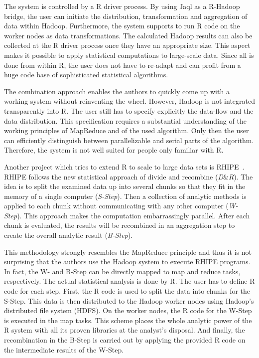 The system is controlled by a R driver process.
By using Jaql as a R-Hadoop bridge, the user can initiate the distribution, transformation and aggregation of data within Hadoop.
Furthermore, the system supports to run R code on the worker nodes as data transformations.
The calculated Hadoop results can also be collected at the R driver process once they have an appropriate size.
This aspect makes it possible to apply statistical computations to large-scale data.
Since all is done from within R, the user does not have to re-adapt and can profit from a huge code base of sophisticated statistical algorithms.

The combination approach enables the authors to quickly come up with a working system without reinventing the wheel.
However, Hadoop is not integrated transparently into R.
The user still has to specify explicitly the data-flow and the data distribution.
This specification requires a substantial understanding of the working principles of MapReduce and of the used algorithm.
Only then the user can efficiently distinguish between parallelizable and serial parts of the algorithm.
Therefore, the system is not well suited for people only familiar with R.

Another project which tries to extend R to scale to large data sets is RHIPE~\cite{guha:s2012a}.
RHIPE follows the new statistical approach of divide and recombine (\emph{D}\&\emph{R}).
The idea is to split the examined data up into several chunks so that they fit in the memory of a single computer (\emph{S-Step}).
Then a collection of analytic methods is applied to each chunk without communicating with any other computer (\emph{W-Step}).
This approach makes the computation embarrassingly parallel.
After each chunk is evaluated, the results will be recombined in an aggregation step to create the overall analytic result (\emph{B-Step}).

This methodology strongly resembles the MapReduce principle and thus it is not surprising that the authors use the Hadoop system to execute RHIPE programs.
In fact, the W- and B-Step can be directly mapped to map and reduce tasks, respectively.
The actual statistical analysis is done by R.
The user has to define R code for each step.
First, the R code is used to split the data into chunks for the S-Step.
This data is then distributed to the Hadoop worker nodes using Hadoop's distributed file system (HDFS).
On the worker nodes, the R code for the W-Step is executed in the map tasks.
This scheme places the whole analytic power of the R system with all its proven libraries at the analyst's disposal.
And finally, the recombination in the B-Step is carried out by applying the provided R code on the intermediate results of the W-Step.

